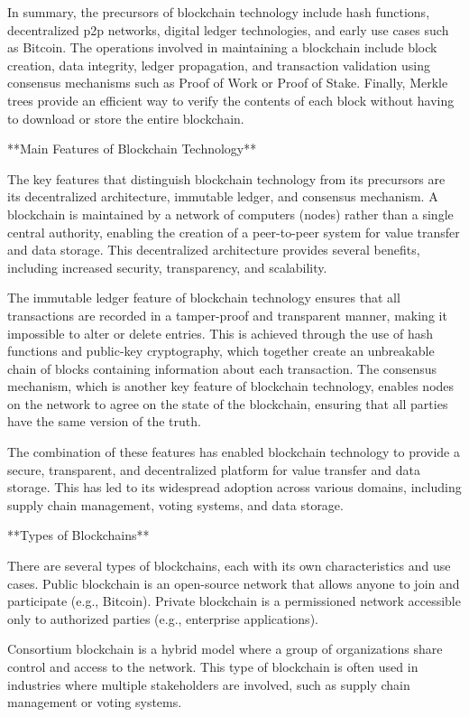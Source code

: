 \begin{documen}
In summary, the precursors of blockchain technology include hash functions, decentralized p2p networks, digital ledger technologies, and early use cases such as Bitcoin. The operations involved in maintaining a blockchain include block creation, data integrity, ledger propagation, and transaction validation using consensus mechanisms such as Proof of Work or Proof of Stake. Finally, Merkle trees provide an efficient way to verify the contents of each block without having to download or store the entire blockchain.

**Main Features of Blockchain Technology**

The key features that distinguish blockchain technology from its precursors are its decentralized architecture, immutable ledger, and consensus mechanism. A blockchain is maintained by a network of computers (nodes) rather than a single central authority, enabling the creation of a peer-to-peer system for value transfer and data storage. This decentralized architecture provides several benefits, including increased security, transparency, and scalability.

The immutable ledger feature of blockchain technology ensures that all transactions are recorded in a tamper-proof and transparent manner, making it impossible to alter or delete entries. This is achieved through the use of hash functions and public-key cryptography, which together create an unbreakable chain of blocks containing information about each transaction. The consensus mechanism, which is another key feature of blockchain technology, enables nodes on the network to agree on the state of the blockchain, ensuring that all parties have the same version of the truth.

The combination of these features has enabled blockchain technology to provide a secure, transparent, and decentralized platform for value transfer and data storage. This has led to its widespread adoption across various domains, including supply chain management, voting systems, and data storage.

**Types of Blockchains**

There are several types of blockchains, each with its own characteristics and use cases. Public blockchain is an open-source network that allows anyone to join and participate (e.g., Bitcoin). Private blockchain is a permissioned network accessible only to authorized parties (e.g., enterprise applications).

Consortium blockchain is a hybrid model where a group of organizations share control and access to the network. This type of blockchain is often used in industries where multiple stakeholders are involved, such as supply chain management or voting systems.


\end{documen}
